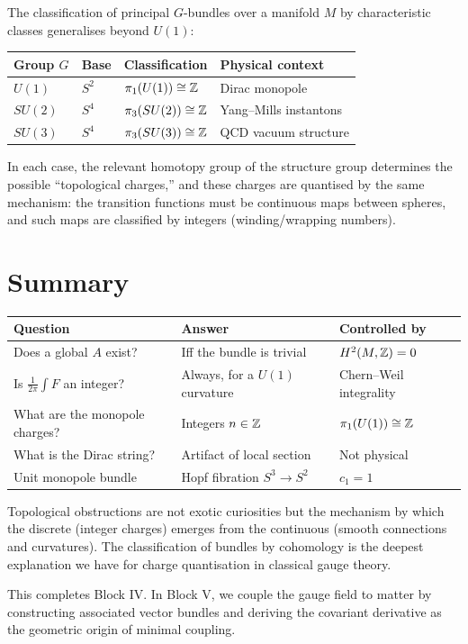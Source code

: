 The classification of principal $G$-bundles over a manifold $M$ by characteristic classes generalises beyond $U(1)$:

\begin{table}[h]
\centering
\renewcommand{\arraystretch}{1.4}
\begin{tabular}{llll}
\toprule
\textbf{Group $G$} & \textbf{Base} & \textbf{Classification} & \textbf{Physical context} \\
\midrule
$U(1)$ & $S^2$ & $\pi_1(U(1)) \cong \mathbb{Z}$ & Dirac monopole \\
$SU(2)$ & $S^4$ & $\pi_3(SU(2)) \cong \mathbb{Z}$ & Yang--Mills instantons \\
$SU(3)$ & $S^4$ & $\pi_3(SU(3)) \cong \mathbb{Z}$ & QCD vacuum structure \\
\bottomrule
\end{tabular}
\end{table}

In each case, the relevant homotopy group of the structure group determines the possible ``topological charges,'' and these charges are quantised by the same mechanism: the transition functions must be continuous maps between spheres, and such maps are classified by integers (winding/wrapping numbers).

\section{Summary}

\begin{table}[h]
\centering
\renewcommand{\arraystretch}{1.4}
\begin{tabular}{lll}
\toprule
\textbf{Question} & \textbf{Answer} & \textbf{Controlled by} \\
\midrule
Does a global $A$ exist? & Iff the bundle is trivial & $H^2(M, \mathbb{Z}) = 0$ \\
Is $\frac{1}{2\pi}\int F$ an integer? & Always, for a $U(1)$ curvature & Chern--Weil integrality \\
What are the monopole charges? & Integers $n \in \mathbb{Z}$ & $\pi_1(U(1)) \cong \mathbb{Z}$ \\
What is the Dirac string? & Artifact of local section & Not physical \\
Unit monopole bundle & Hopf fibration $S^3 \to S^2$ & $c_1 = 1$ \\
\bottomrule
\end{tabular}
\end{table}

Topological obstructions are not exotic curiosities but the mechanism by which the discrete (integer charges) emerges from the continuous (smooth connections and curvatures). The classification of bundles by cohomology is the deepest explanation we have for charge quantisation in classical gauge theory.

This completes Block IV. In Block V, we couple the gauge field to matter by constructing associated vector bundles and deriving the covariant derivative as the geometric origin of minimal coupling.
